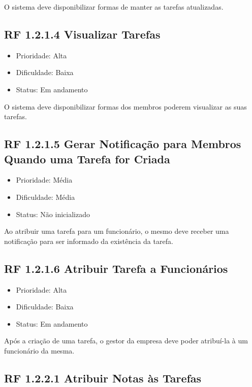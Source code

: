 \begin{apendicesenv}
O sistema deve disponibilizar formas de manter as tarefas atualizadas.


\subsection{RF 1.2.1.4 Visualizar Tarefas}

\begin{itemize}
  \item{Prioridade: Alta}
  \item{Dificuldade: Baixa}
  \item{Status: Em andamento}
\end{itemize}

O sistema deve disponibilizar formas dos membros poderem visualizar as suas tarefas.


\subsection{RF 1.2.1.5 Gerar Notificação para Membros Quando uma Tarefa for Criada}

\begin{itemize}
  \item{Prioridade: Média}
  \item{Dificuldade: Média}
  \item{Status: Não inicializado}
\end{itemize}

Ao atribuir uma tarefa para um funcionário, o mesmo deve receber uma notificação para ser informado da existência da tarefa.


\subsection{RF 1.2.1.6 Atribuir Tarefa a Funcionários}

\begin{itemize}
  \item{Prioridade: Alta}
  \item{Dificuldade: Baixa}
  \item{Status: Em andamento}
\end{itemize}

Após a criação de uma tarefa, o gestor da empresa deve poder atribuí-la à um funcionário da mesma.


\subsection{RF 1.2.2.1 Atribuir Notas às Tarefas}


\end{apendicesenv}
